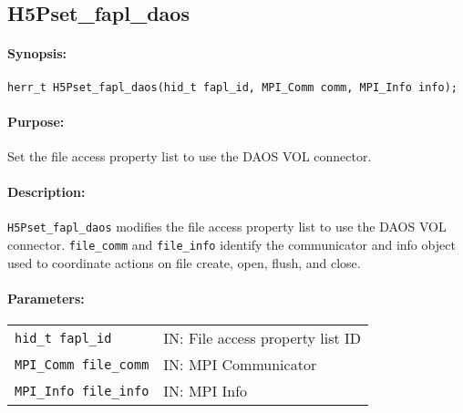 \documentclass[../users_guide.tex]{subfiles}
\begin{document}
\newpage
\subsection{H5Pset\_fapl\_daos}
\label{ref:h5pset_fapl_daos}

\paragraph{Synopsis:}
\begin{flushleft}%
\begin{verbatim}
herr_t H5Pset_fapl_daos(hid_t fapl_id, MPI_Comm comm, MPI_Info info);
\end{verbatim}
\end{flushleft}%

\paragraph{Purpose:}
\begin{flushleft}%
Set the file access property list to use the DAOS VOL connector.
\end{flushleft}%

\paragraph{Description:}
\begin{flushleft}%
\texttt{H5Pset\_fapl\_daos} modifies the file access property list to use the
DAOS VOL connector. \texttt{file\_comm} and
\texttt{file\_info} identify the communicator and info object used to
coordinate actions on file create, open, flush, and close.
\end{flushleft}%

\paragraph{Parameters:}
\begin{flushleft}%
 \begin{tabular}{ll}%
   \texttt{hid\_t fapl\_id} & IN: File access property list ID \\
   \texttt{MPI\_Comm file\_comm} & IN: MPI Communicator \\
   \texttt{MPI\_Info file\_info} & IN: MPI Info \\
 \end{tabular}%
\end{flushleft}%
\end{document}
